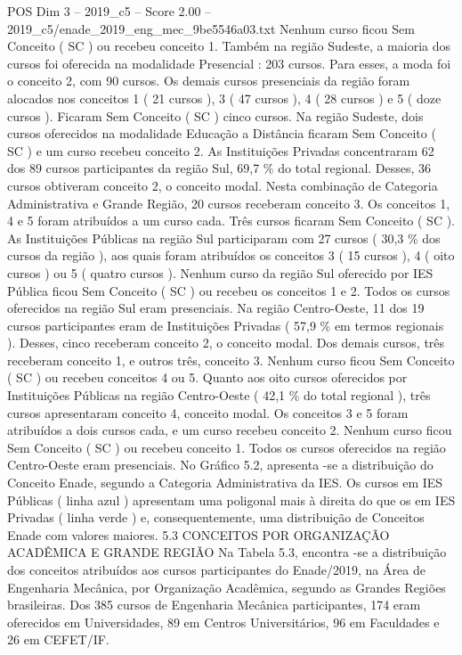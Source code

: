 \begin{textsample}{POS Dim 3 – 2019\_c5 – Score 2.00 – 2019\_c5/enade\_2019\_eng\_mec\_9be5546a03.txt}
Nenhum curso ficou Sem Conceito ( SC ) ou recebeu conceito 1.
Também na região Sudeste, a maioria dos cursos foi oferecida na modalidade Presencial : 203 cursos.
Para esses, a moda foi o conceito 2, com 90 cursos.
Os demais cursos presenciais da região foram alocados nos conceitos 1 ( 21 cursos ), 3 ( 47 cursos ), 4 ( 28 cursos ) e 5 ( doze cursos ).
Ficaram Sem Conceito ( SC ) cinco cursos.
Na região Sudeste, dois cursos oferecidos na modalidade Educação a Distância ficaram Sem Conceito ( SC ) e um curso recebeu conceito 2.
As Instituições Privadas concentraram 62 dos 89 cursos participantes da região Sul, 69,7 \% do total regional.
Desses, 36 cursos obtiveram conceito 2, o conceito modal.
Nesta combinação de Categoria Administrativa e Grande Região, 20 cursos receberam conceito 3.
Os conceitos 1, 4 e 5 foram atribuídos a um curso cada.
Três cursos ficaram Sem Conceito ( SC ).
As Instituições Públicas na região Sul participaram com 27 cursos ( 30,3 \% dos cursos da região ), aos quais foram atribuídos os conceitos 3 ( 15 cursos ), 4 ( oito cursos ) ou 5 ( quatro cursos ).
Nenhum curso da região Sul oferecido por IES Pública ficou Sem Conceito ( SC ) ou recebeu os conceitos 1 e 2.
Todos os cursos oferecidos na região Sul eram presenciais.
Na região Centro-Oeste, 11 dos 19 cursos participantes eram de Instituições Privadas ( 57,9 \% em termos regionais ).
Desses, cinco receberam conceito 2, o conceito modal.
Dos demais cursos, três receberam conceito 1, e outros três, conceito 3.
Nenhum curso ficou Sem Conceito ( SC ) ou recebeu conceitos 4 ou 5.
Quanto aos oito cursos oferecidos por Instituições Públicas na região Centro-Oeste ( 42,1 \% do total regional ), três cursos apresentaram conceito 4, conceito modal.
Os conceitos 3 e 5 foram atribuídos a dois cursos cada, e um curso recebeu conceito 2.
Nenhum curso ficou Sem Conceito ( SC ) ou recebeu conceito 1.
Todos os cursos oferecidos na região Centro-Oeste eram presenciais.
No Gráfico 5.2, apresenta -se a distribuição do Conceito Enade, segundo a Categoria Administrativa da IES.
Os cursos em IES Públicas ( linha azul ) apresentam uma poligonal mais à direita do que os em IES Privadas ( linha verde ) e, consequentemente, uma distribuição de Conceitos Enade com valores maiores. 5.3 CONCEITOS POR ORGANIZAÇÃO ACADÊMICA E GRANDE REGIÃO Na Tabela 5.3, encontra -se a distribuição dos conceitos atribuídos aos cursos participantes do Enade/2019, na Área de Engenharia Mecânica, por Organização Acadêmica, segundo as Grandes Regiões brasileiras.
Dos 385 cursos de Engenharia Mecânica participantes, 174 eram oferecidos em Universidades, 89 em Centros Universitários, 96 em Faculdades e 26 em CEFET/IF.

\end{textsample}
